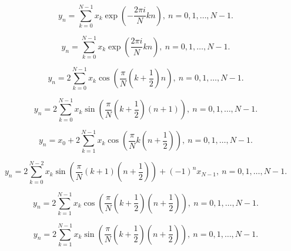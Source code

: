 \documentclass[12pt,a4paper]{article}
\begin{document}
$$
y_n = \sum_{k=0}^{N-1}x_k\exp(-\frac{2\pi i}{N}kn),
\ n=0,1,\dots,N\!\!-\!\!1.
$$
\newpage

$$
y_n = \sum_{k=0}^{N-1}x_k\exp(\frac{2\pi i}{N}kn),
\ n=0,1,\dots,N\!\!-\!\!1.
$$
\newpage

$$
y_n = 2\sum_{k=0}^{N-1}x_k\cos(\frac{\pi}{N}(k+\frac{1}{2})n),
\ n=0,1,\dots,N\!\!-\!\!1.
$$
\newpage

$$
y_n = 2\sum_{k=0}^{N-1}x_k\sin(\frac{\pi}{N}(k+\frac{1}{2})(n+1)),
\ n=0,1,\dots,N\!\!-\!\!1.
$$
\newpage

$$
y_n = x_0 + 2\sum_{k=1}^{N-1}x_k\cos(\frac{\pi}{N}k(n+\frac{1}{2})),
\ n=0,1,\dots,N\!\!-\!\!1.
$$
\newpage

$$
y_n = 2\sum_{k=0}^{N-2}x_k\sin(\frac{\pi}{N}(k+1)(n+\frac{1}{2}))+(-1)^{n}x_{N-1},
\ n=0,1,\dots,N\!\!-\!\!1.
$$
\newpage

$$
y_n = 2\sum_{k=1}^{N-1}x_k\cos(\frac{\pi}{N}(k+\frac{1}{2})(n+\frac{1}{2})),
\ n=0,1,\dots,N\!\!-\!\!1.
$$
\newpage

$$
y_n = 2\sum_{k=1}^{N-1}x_k\sin(\frac{\pi}{N}(k+\frac{1}{2})(n+\frac{1}{2})),
\ n=0,1,\dots,N\!\!-\!\!1.
$$
\end{document}
